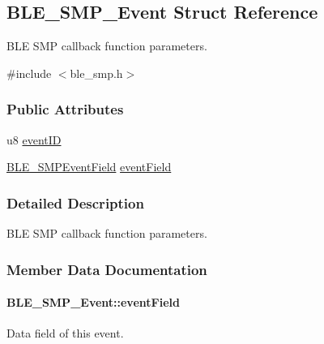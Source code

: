 \hypertarget{struct_b_l_e___s_m_p___event}{}\subsection{B\+L\+E\+\_\+\+S\+M\+P\+\_\+\+Event Struct Reference}
\label{struct_b_l_e___s_m_p___event}


B\+LE S\+MP callback function parameters.  




{\ttfamily \#include $<$ble\+\_\+smp.\+h$>$}

\subsubsection*{Public Attributes}
\begin{DoxyCompactItemize}
\item 
u8 \hyperlink{struct_b_l_e___s_m_p___event_a3a6d332f1044b7ca8a79b36c8d4f68e3}{event\+ID}
\item 
\hyperlink{union_b_l_e___s_m_p_event_field}{B\+L\+E\+\_\+\+S\+M\+P\+Event\+Field} \hyperlink{struct_b_l_e___s_m_p___event_a4e55de2d474c80a3c47f1b2b6b754681}{event\+Field}
\end{DoxyCompactItemize}


\subsubsection{Detailed Description}
B\+LE S\+MP callback function parameters. 

\subsubsection{Member Data Documentation}
\paragraph[{\texorpdfstring{event\+Field}{eventField}}]{ B\+L\+E\+\_\+\+S\+M\+P\+\_\+\+Event\+::event\+Field}\hypertarget{struct_b_l_e___s_m_p___event_a4e55de2d474c80a3c47f1b2b6b754681}{}\label{struct_b_l_e___s_m_p___event_a4e55de2d474c80a3c47f1b2b6b754681}
Data field of this event. 

